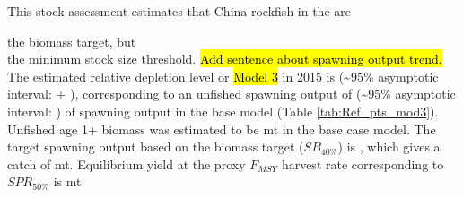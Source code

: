 \documentclass[12pt,]{article}
\begin{document}
This stock assessment estimates that China rockfish in the are

the biomass target, but\\
the minimum stock size threshold.
\hl{Add sentence about spawning output trend.} The estimated relative
depletion level or \hl{Model 3} in 2015 is (\textasciitilde{}95\%
asymptotic interval: \(\pm\) ), corresponding to an unfished spawning
output of (\textasciitilde{}95\% asymptotic interval: ) of spawning
output in the base model (Table \ref{tab:Ref_pts_mod3}). Unfished age 1+
biomass was estimated to be mt in the base case model. The target
spawning output based on the biomass target (\(SB_{40\%}\)) is , which
gives a catch of mt. Equilibrium yield at the proxy \(F_{MSY}\) harvest
rate corresponding to \(SPR_{50\%}\) is mt.

\FloatBarrier
\end{document}
